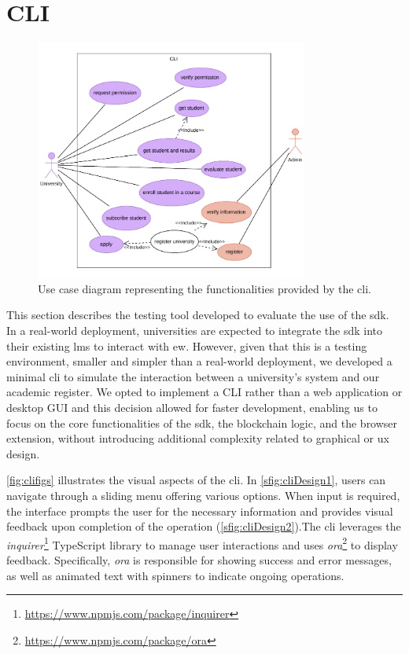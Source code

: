 \section{CLI}
\label{sec:cliDesign}
\begin{figure}
  \centering
  \includegraphics[width=0.8\textwidth]{figures/CLI use case diagram.pdf}
  \caption[\acrshort{cli} use case diagram]{Use case diagram representing the functionalities provided by the \acrshort{cli}.}
  \label{fig:useCaseCli}
\end{figure}
This section describes the testing tool developed to evaluate the use of the \acrshort{sdk}. In a real-world deployment, universities are expected to integrate the \acrshort{sdk} into their existing \acrshort{lms} to interact with \acrlong{ew}. However, given that this is a testing environment, smaller and simpler than a real-world deployment, we developed a minimal \acrlong{cli} to simulate the interaction between a university's system and our academic register. We opted to implement a CLI rather than a web application or desktop GUI and this decision allowed for faster development, enabling us to focus on the core functionalities of the \acrshort{sdk}, the blockchain logic, and the browser extension, without introducing additional complexity related to graphical or \acrfull{ux} design.

\cref{fig:clifigs} illustrates the visual aspects of the \acrshort{cli}. In \cref{sfig:cliDesign1}, users can navigate through a sliding menu offering various options. When input is required, the interface prompts the user for the necessary information and provides visual feedback upon completion of the operation (\cref{sfig:cliDesign2}).The \acrshort{cli} leverages the \textit{inquirer}\footnote{\url{https://www.npmjs.com/package/inquirer}} TypeScript library to manage user interactions and uses \textit{ora}\footnote{\url{https://www.npmjs.com/package/ora}} to display feedback. Specifically, \textit{ora} is responsible for showing success and error messages, as well as animated text with spinners to indicate ongoing operations.

